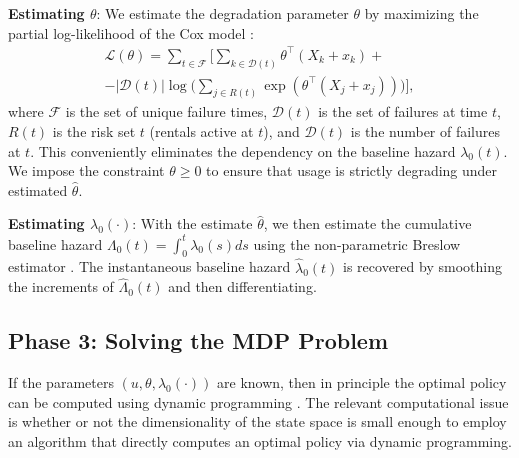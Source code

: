 \documentclass[conference]{IEEEtran}
\begin{document}
\textbf{Estimating ${\theta}$}: We estimate the degradation parameter $\theta$ by maximizing the partial log-likelihood of the Cox model \cite{vittinghoff2012regression,cox1972regression}:
\begin{multline}
    \mathcal{L}(\theta) = \sum_{t\in \mathcal{F}}\Bigg[ \sum_{k\in\mathcal{D}(t)} \theta^\top(X_k + x_k) + \\
    -|\mathcal{D}(t)|\log \Big( \sum_{j \in R(t)} \exp(\theta^\top(X_j + x_j))\Big)\Bigg],
\end{multline}
where $\mathcal{F}$ is the set of unique failure times, $\mathcal{D}(t)$ is the set of failures at time $t$, $R(t)$ is the risk set $t$ (rentals active at $t$), and $\mathcal{D}(t)$ is the number of failures at $t$. This conveniently eliminates the dependency on the baseline hazard $\lambda_0(t)$. We impose the constraint $\theta \geq 0$ to ensure that usage is strictly degrading under estimated $\widehat\theta$. 

\textbf{Estimating ${\lambda}_0(\cdot)$}: With the estimate $\widehat{\theta}$, we then estimate the cumulative baseline hazard $\Lambda_0(t) = \int_0^t \lambda_0(s) ds$ using the non-parametric Breslow estimator \cite{breslow1972contribution}. The instantaneous baseline hazard $\widehat{\lambda}_0(t)$ is recovered by smoothing the increments of $\widehat{\Lambda}_0(t)$ and then differentiating.

\subsection{Phase 3: Solving the MDP Problem}

If the parameters $(u,\theta,\lambda_0(\cdot))$ are known, then in principle the optimal policy can be computed using dynamic programming \cite{Bertsekas2017VolI,Bertsekas2012VolII}. The relevant computational issue is whether or not the dimensionality of the state space is small enough to employ an algorithm that directly computes an optimal policy via dynamic programming.
\end{document}
